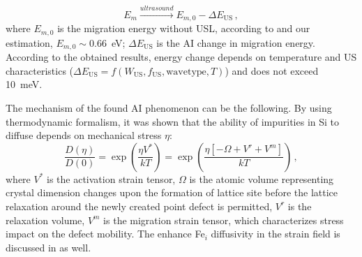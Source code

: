 \documentclass[sn-mathphys]{sn-jnl}%
\theoremstyle{thmstyleone}%
\theoremstyle{thmstyletwo}%
\theoremstyle{thmstylethree}%
\begin{document}
\begin{equation}
\label{eqEmUs}
E_m \xrightarrow{ultrasound} E_{m,0}-\Delta E_\mathrm{US}\,,
\end{equation}
where $E_{m,0}$ is the migration energy without USL,
according to \cite{FeBAssJAP2014,FeBkinAPL2008} and our estimation, $E_{m,0}\sim0.66$~eV;
$\Delta E_\mathrm{US}$ is the AI change in migration energy.
According to the obtained results, energy change depends on temperature and US characteristics ($\Delta E_\mathrm{US}=f(W_\mathrm{US},f_\mathrm{US}, \mathrm{wave type}, T)$) and does not exceed 10~meV.

The mechanism of the found AI phenomenon can be the following.
By using thermodynamic formalism, it was shown \cite{AZIZ2001} that the ability of
impurities in Si to diffuse depends on mechanical stress $\eta$:
\begin{equation}
\label{eqTeor}
\frac{D(\eta)}{D(0)}=\exp\left(\frac{\eta V^*}{kT}\right)=
\exp\left(\frac{\eta [-\Omega+V^r+V^m]}{kT}\right)\,,
\end{equation}
where
$V^*$ is the activation strain tensor,
$\Omega$ is the atomic volume representing  crystal dimension changes
upon the formation of lattice site before the lattice relaxation
around the newly created point defect is permitted,
$V^r$ is the relaxation volume,
$V^m$ is the migration strain tensor, which characterizes stress impact on the defect mobility.
The enhance Fe$_i$ diffusivity in the strain field is discussed in \cite{FeStrain} as well.

\end{document}
